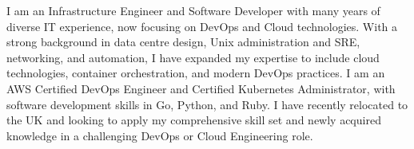 

I am an Infrastructure Engineer and Software Developer with many years of diverse IT experience, now focusing on DevOps and Cloud technologies. With a strong background in data centre design, Unix administration and SRE, networking, and automation, I have expanded my expertise to include cloud technologies, container orchestration, and modern DevOps practices. I am an AWS Certified DevOps Engineer and Certified Kubernetes Administrator, with software development skills in Go, Python, and Ruby. I have recently relocated to the UK and looking to apply my comprehensive skill set and newly acquired knowledge in a challenging DevOps or Cloud Engineering role.



